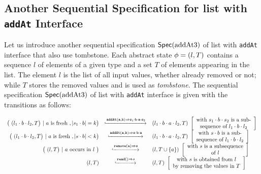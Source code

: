 \subsection{Another Sequential Specification for list with {\tt addAt} Interface}
\label{subsec:another sequential specification for list with addAt interface}

Let us introduce another sequential specification $\mathsf{Spec}(\text{addAt3})$ of list with {\tt addAt} interface that also use tombstone. Each abstract state $\phi = (l,T)$ contains a sequence $l$ of elements of a given type and a set $T$ of elements appearing in the list. The element $l$ is the list of all input values, whether already removed or not; while $T$ stores the removed values and is used as \emph{tombstone}. The sequential specification $\mathsf{Spec}(\text{addAt3})$ of list with {\tt addAt} interface is given with the transitions as follows:

\[
  \begin{array}{rcl}
    \big(\ (l_1 \cdot b \cdot l_2,T\big)\ |\ a\text{ is fresh}\ , \vert s_1 \cdot b\vert = k \big)
     & \specarrow{\alabellong[{\tt addAt}]{a,k}{s_1 \cdot b \cdot a \cdot s_2}{}}
     & (l_1 \cdot b \cdot a \cdot l_2,T)\
       \left[\begin{array}{c}
           \text{with $s_1 \cdot b \cdot s_2$ is a sub-}\\
           \text{sequence of $l_1 \cdot b \cdot l_2$}
       \end{array}\right]\\
     \big(\ (l_1 \cdot b \cdot l_2,T\big)\ |\ a\text{ is fresh}\ , \vert s \cdot b \vert <k \big)
     & \specarrow{\alabellong[{\tt addAt}]{a,k}{s \cdot b \cdot a}{}}
     & (l_1 \cdot b \cdot a \cdot l_2,T)\
       \left[\begin{array}{c}
           \text{with $s \cdot b$ is a sub-}\\
           \text{sequence of $l_1 \cdot b \cdot l_2$}
       \end{array}\right]\\
     \big(\ (l,T\big)\ |\ a\ \text{occurs in}\ l\ \big)
     & \specarrow{\alabellong[{\tt remove}]{a}{s}{}}
     & (l,T \cup \{ a \})\
       \left[\begin{array}{c}
           \text{with $s$ is a subsequence}\\
           \text{of $l$}
       \end{array}\right]\\
     (l,T)
     & \specarrow{\alabellong[\mathtt{read}]{}{s}{}}
     & (l,T)\
       \left[\begin{array}{c}
           \text{with $s$ is obtained from $l$}\\
           \text{by removing the values in $T$}
       \end{array}\right]
   \end{array}
\]

